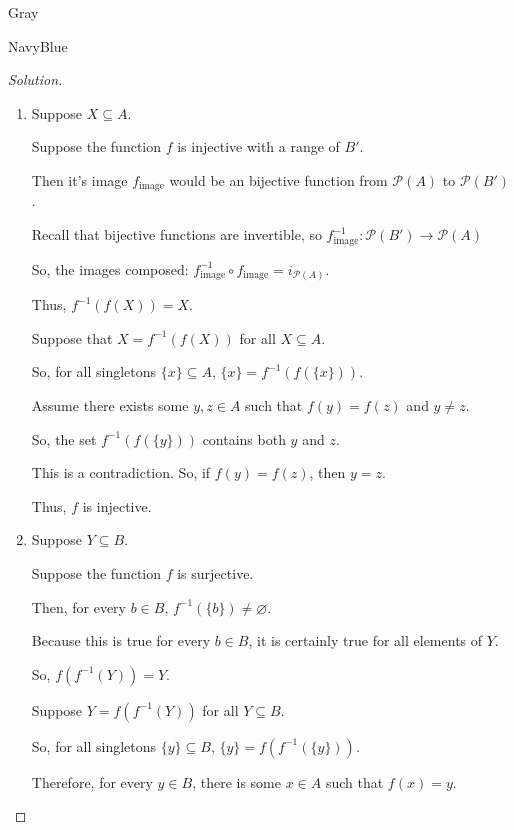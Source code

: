 \documentclass[12pt]{amsart}
\theoremstyle{named}
\newenvironment{soln}
{\begin{color}{Gray}\begin{framed}\begin{color}{NavyBlue}\begin{proof}[Solution]
\doublespacing}
{\end{proof}\end{color}\end{framed}\end{color}}
\theoremstyle{definition}
\begin{document}
\begin{soln}
	\phantom{ }
    
    \begin{enumerate}
        \item 
        \phantom{ }

        \noindent Suppose $X \subseteq A$.

        \noindent Suppose the function $f$ is injective with a range of $B'$.

        \noindent Then it's image $f_{\text{image}}$ would be an bijective function from $\mathscr
        P (A)$ to $\mathscr P(B')$. 

        \noindent Recall that bijective functions are invertible, so $f^{-1}_{\text{image}} : 
        \mathscr P(B') \rightarrow \mathscr P(A)$

        \noindent So, the images composed: $f^{-1}_\text{image} \circ f_\text{image} = i_{\mathscr P(A)}$.
        
        \noindent Thus, $f^{-1}(f(X)) = X$.

        \phantom{ }

        \noindent Suppose that $X = f^{-1}(f(X))$ for all $X \subseteq A$.

        \noindent So, for all singletons $\{x\} \subseteq A$, $\{x\} = f^{-1}(f(\{x\}))$.

        \noindent Assume there exists some $y,z \in A$ such that $f(y) = f(z)$ and $y \neq z$. 

        \noindent So, the set $f^{-1}(f(\{y\}))$ contains both $y$ and $z$. 

        \noindent This is a contradiction. So, if $f(y) = f(z)$, then $y = z$.

        \noindent Thus, $f$ is injective.     

        \item
        \phantom{ }
        
        \noindent Suppose $Y \subseteq B$.

        \noindent Suppose the function $f$ is surjective. 

        \noindent Then, for every $b \in B$, $f^{-1}(\{b\}) \neq \varnothing$.
        

        \noindent Because this is true for every $b \in B$, it is certainly true
        for all elements of $Y$. 

        \noindent So, $f(f^{-1}(Y)) = Y$. 

        \phantom{ }

        \noindent Suppose $Y = f(f^{-1}(Y))$ for all $Y \subseteq B$.

        \noindent So, for all singletons $\{y\} \subseteq B$, $\{y\} = f(f^{-1}(\{y\}))$.

        \noindent Therefore, for every $y \in B$, there is some $x \in A$ such that $f(x) = y$. 


    \end{enumerate}
\end{soln}
\end{document}
